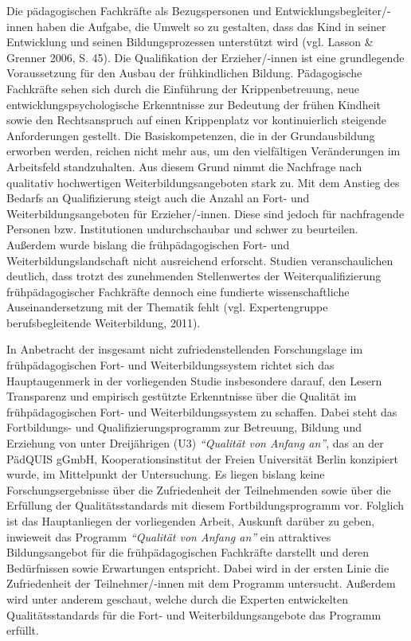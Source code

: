 \documentclass[12pt,a4paper]{article}
\begin{document}
Die pädagogischen Fachkräfte als Bezugspersonen und Ent\-wick\-lungs\-be\-glei\-ter/-innen haben die Aufgabe, die Umwelt so zu gestalten, dass das Kind in seiner Entwicklung und seinen Bildungsprozessen unterstützt wird (vgl. Lasson \& Grenner 2006, S. 45). Die Qualifikation der Erzieher/-innen ist eine grundlegende Voraussetzung für den Ausbau der frühkindlichen Bildung. Pädagogische Fachkräfte sehen sich durch die Einführung der Krippenbetreuung, neue entwicklungspsychologische Erkenntnisse zur Bedeutung der frühen Kindheit sowie den Rechtsanspruch auf einen Krippenplatz vor kontinuierlich steigende Anforderungen gestellt. Die Basiskompetenzen, die in der Grundausbildung erworben werden, reichen nicht mehr aus, um den vielfältigen Veränderungen im Arbeitsfeld standzuhalten. Aus diesem Grund  nimmt die Nachfrage nach qualitativ hochwertigen Weiterbildungsangeboten stark zu. Mit dem Anstieg des Bedarfs an Qualifizierung steigt auch die Anzahl an Fort- und Weiterbildungsangeboten für Erzieher/-innen. Diese sind jedoch für nachfragende Personen bzw. Institutionen undurchschaubar und schwer zu beurteilen. Außerdem wurde bislang die frühpädagogischen Fort- und Weiterbildungslandschaft nicht ausreichend erforscht. Studien veranschaulichen deutlich, dass trotzt des zunehmenden Stellenwertes der Weiterqualifizierung frühpädagogischer Fachkräfte dennoch eine fundierte wissenschaftliche Auseinandersetzung mit der Thematik  fehlt (vgl. Expertengruppe berufsbegleitende Weiterbildung, 2011).

	In Anbetracht der insgesamt nicht zufriedenstellenden Forschungslage im früh\-päda\-gogi\-schen Fort- und Weiterbildungssystem richtet sich das Hauptaugenmerk in der vorliegenden Studie insbesondere darauf, den Lesern Transparenz und empirisch gestützte Erkenntnisse über die Qualität im früh\-päda\-gogi\-schen  Fort- und Weiterbildungssystem zu schaffen. Dabei steht das Fortbildungs- und Qua\-li\-fi\-zie\-rungs\-pro\-gramm zur Betreuung, Bildung und Erziehung von unter Dreijährigen (U3) \textit{ "`Qualität von Anfang an"'}, das an der PädQUIS gGmbH, Kooperationsinstitut der Freien Universität Berlin konzipiert wurde, im Mittelpunkt der Untersuchung. Es liegen bislang keine Forschungsergebnisse über die Zufriedenheit der Teilnehmenden sowie über die Erfüllung der Qua\-li\-täts\-stan\-dards mit diesem Fortbildungsprogramm vor. Folglich ist das Hauptanliegen der vorliegenden Arbeit, Auskunft darüber zu geben, inwieweit das Programm \textit{"`Qualität von Anfang an"'} ein attraktives Bildungsangebot für die früh\-pä\-da\-go\-gi\-schen Fachkräfte darstellt und deren Bedürfnissen sowie Erwartungen entspricht. Dabei wird in der ersten Linie die Zufriedenheit der Teilnehmer/-innen mit dem Programm untersucht. Außerdem wird unter anderem geschaut,  welche durch die Experten entwickelten Qualitätsstandards für die Fort- und Weiterbildungsangebote das Programm erfüllt. 
	
\end{document}
